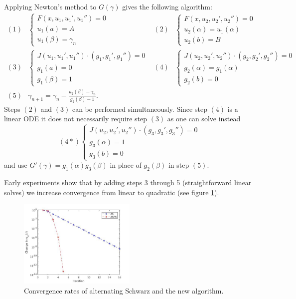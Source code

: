 \documentclass{book}
\begin{document}
Applying Newton's method to $G(\gamma)$ gives the following algorithm:
\begin{equation}
\begin{aligned} \label{alg:ASPN}
(1) & \begin{cases} F(x,u_1,u_1',u_1'') = 0 \\ u_1(a) = A \\ u_1(\beta) = \gamma_n \end{cases} &
(2) & \begin{cases} F(x,u_2,u_2',u_2'') = 0 \\ u_2(\alpha) = u_1(\alpha) \\ u_2(b) = B \end{cases} \\
(3) & \begin{cases} J(u_1,u_1',u_1'') \cdot (g_1,g_1',g_1'') = 0 \\ g_1(a) = 0 \\ g_1(\beta) = 1 \end{cases} &
(4) & \begin{cases} J(u_2,u_2',u_2'') \cdot (g_2,g_2',g_2'') = 0 \\ g_2(\alpha) = g_1(\alpha) \\ g_2(b) = 0 \end{cases} \\
(5) & \gamma_{n+1} = \gamma_n - \frac{ u_2(\beta) - \gamma_n }{g_2(\beta) - 1}. & &
\end{aligned}
\end{equation}
Steps $(2)$ and $(3)$ can be performed simultaneously.
Since step $(4)$ is a linear ODE it does not necessarily require step $(3)$ as one can solve instead
\begin{equation*}
(4*) \begin{cases} J(u_2,u_2',u_2'') \cdot (g_3,\textit{g}_3',\textit{g}_3'') = 0 \\
g_3(\alpha) = 1 \\ g_3(b) = 0 \end{cases}
\end{equation*}
and use $G'(\gamma) = g_1(\alpha) g_3(\beta)$ in place of $g_2(\beta)$ in step $(5)$.

Early experiments show that by adding steps 3 through 5 (straightforward linear solves) we increase convergence from linear to quadratic (see figure \ref{fig:ASPN01}).

\begin{figure}
\centering
	\includegraphics[width=0.5\textwidth]{ASPN01.jpg}
	\caption{Convergence rates of alternating Schwarz and the new algorithm.}
	\label{fig:ASPN01}
\end{figure}
\end{document}
